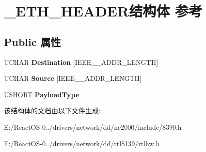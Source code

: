 \hypertarget{struct___e_t_h___h_e_a_d_e_r}{}\section{\+\_\+\+E\+T\+H\+\_\+\+H\+E\+A\+D\+E\+R结构体 参考}
\label{struct___e_t_h___h_e_a_d_e_r}
\subsection*{Public 属性}
\begin{DoxyCompactItemize}
\item 
\mbox{\label{struct___e_t_h___h_e_a_d_e_r_a7ce47c833d8904d1aaa184650b8cece4}} 
U\+C\+H\+AR {\bfseries Destination} \mbox{[}I\+E\+E\+E\+\_\+\_\+\+A\+D\+D\+R\+\_\+\+L\+E\+N\+G\+TH\mbox{]}
\item 
\mbox{\label{struct___e_t_h___h_e_a_d_e_r_ae44eff772e500283564ce5bc4cc13a61}} 
U\+C\+H\+AR {\bfseries Source} \mbox{[}I\+E\+E\+E\+\_\+\_\+\+A\+D\+D\+R\+\_\+\+L\+E\+N\+G\+TH\mbox{]}
\item 
\mbox{\label{struct___e_t_h___h_e_a_d_e_r_af6ac92cfb63fdbac8722afc99492c755}} 
U\+S\+H\+O\+RT {\bfseries Payload\+Type}
\end{DoxyCompactItemize}


该结构体的文档由以下文件生成\+:\begin{DoxyCompactItemize}
\item 
E\+:/\+React\+O\+S-\/0../drivers/network/dd/ne2000/include/8390.\+h\item 
E\+:/\+React\+O\+S-\/0../drivers/network/dd/rtl8139/rtlhw.\+h\end{DoxyCompactItemize}
